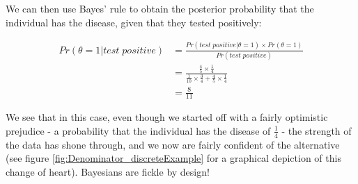 \documentclass[11pt,fullpage]{book}
\begin{document}
We can then use Bayes' rule to obtain the posterior probability that the individual has the disease, given that they tested positively:

\begin{equation}\label{eq:Denominator_discreteExamplePosterior}
\begin{align}
Pr(\theta=1|test\; positive) &= \frac{Pr(test\; positive|\theta=1)\times Pr(\theta=1)}{Pr(test\; positive)}\\
&= \frac{\frac{4}{5} \times \frac{1}{4}}{\frac{1}{10} \times \frac{3}{4} + \frac{4}{5} \times \frac{1}{4}}\\
&= \frac{8}{11}
\end{align}
\end{equation}

We see that in this case, even though we started off with a fairly optimistic prejudice - a probability that the individual has the disease of $\frac{1}{4}$ - the strength of the data has shone through, and we now are fairly confident of the alternative (see figure \ref{fig:Denominator_discreteExample} for a graphical depiction of this change of heart). Bayesians are fickle by design!
\end{document}
